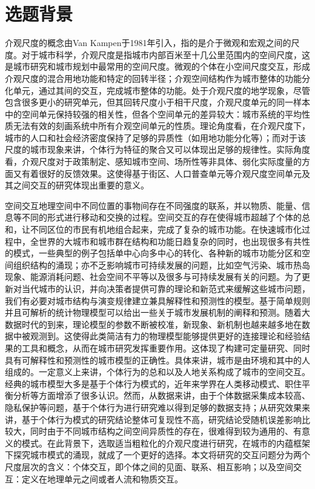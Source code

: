 \chapter{选题背景}
\setcounter{page}{1}



介观尺度的概念由Van Kampen于1981年引入，指的是介于微观和宏观之间的尺度\cite{van1992stochastic}。对于城市科学，介观尺度是指城市内部百米至十几公里范围内的空间尺度，这是城市研究和城市规划中最常用的空间尺度。微观的个体在小空间尺度交互，形成介观尺度的混合用地功能和特定的回转半径；介观空间结构作为城市整体的功能分化单元，通过其间的交互，完成城市整体的功能。处于介观尺度的地学现象，尽管包含很多更小的研究单元，但其回转尺度小于相干尺度，介观尺度单元的同一样本中的空间单元保持较强的相关性，但各个空间单元的差异较大：城市系统的平均性质无法有效的刻画系统中所有介观空间单元的性质。理论角度看，在介观尺度下，城市的人口和社会经济密度保持了足够的异质性（如用地功能分化等）；而对于该尺度的城市现象来讲，个体行为特征的聚合又可以体现出足够的规律性。实际角度看，介观尺度对于政策制定、感知城市空间、场所性等非具体、弱化实际度量的方面又有着很好的反馈效果。这使得基于街区、人口普查单元等介观尺度空间单元及其之间交互的研究体现出重要的意义。

空间交互地理空间中不同位置的事物间存在不同强度的联系，并以物质、能量、信息等不同的形式进行移动和交换的过程\cite{liu1523}。空间交互的存在使得城市超越了个体的总和，让不同区位的市民有机地组合起来，完成了复杂的城市功能。在快速城市化过程中，全世界的大城市和城市群在结构和功能日趋复杂的同时，也出现很多有共性的模式，一些典型的例子包括单中心向多中心的转化、各种新的城市功能分区和空间组织结构的涌现；亦不乏影响城市可持续发展的问题，比如空气污染、城市热岛现象、能源消耗问题、社会空间不平等以及很多与可持续发展有关的问题。为了更新对当代城市的认识，并向决策者提供可靠的理论和新范式来缓解这些城市问题，我们有必要对城市结构与演变规律建立兼具解释性和预测性的模型。基于简单规则并且可解析的统计物理模型可以给出一些关于城市发展机制的阐释和预测。随着大数据时代的到来，理论模型的参数不断被校准，新现象、新机制也越来越多地在数据中被观测到。这使得此类简洁有力的物理模型能够提供更好的连接理论和经验结果的工具和概念，从而在城市研究发挥重要作用。这体现了构建可定量研究、同时具有可解释性和预测性的城市模型的正确性。具体来讲，城市是由环境和其中的人组成的。一定意义上来讲，个体行为的总和以及人地关系构成了城市的空间交互。经典的城市模型大多是基于个体行为模式的，近年来学界在人类移动模式、职住平衡分析等方面增添了很多认识。然而，从数据来讲，由于个体数据采集成本较高、隐私保护等问题，基于个体行为进行研究难以得到足够的数据支持；从研究效果来讲，基于个体行为模式的研究结论整体可复现性不高，研究结论受随机误差影响比较大，同时由于不同城市结构之间空间异质性的存在，很难得到较为通用的、有意义的模式。在此背景下，选取适当粗粒化的介观尺度进行研究，在城市的内蕴框架下探究城市模式的涌现，就成了一个更好的选择。本文将研究的交互问题分为两个尺度层次的含义：个体交互，即个体之间的见面、联系、相互影响；以及空间交互：定义在地理单元之间或者人流和物质交互。

